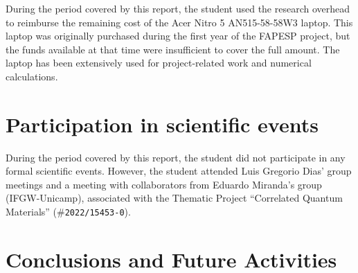\documentclass[12pt]{report}
\begin{document}
During the period covered by this report, the student used the research overhead to reimburse the remaining cost of the Acer Nitro 5 AN515-58-58W3 laptop. This laptop was originally purchased during the first year of the FAPESP project, but the funds available at that time were insufficient to cover the full amount. The laptop has been extensively used for project-related work and numerical calculations.



\chapter{Participation in scientific events} \label{chp:particEvento}

During the period covered by this report, the student did not participate in any formal scientific events. However, the student attended Luis Gregorio Dias' group meetings and a meeting with collaborators from Eduardo Miranda's group (IFGW-Unicamp), associated with the Thematic Project ``Correlated Quantum Materials'' (\#\texttt{2022/15453-0}).


\chapter{Conclusions and Future Activities} \label{chp:conclusions}

%

%




\end{document}

